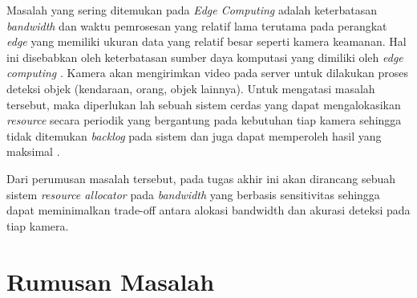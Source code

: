 Masalah yang sering ditemukan pada \textit{Edge Computing} adalah keterbatasan \textit{bandwidth} dan waktu pemrosesan yang relatif lama terutama pada perangkat \textit{edge} yang memiliki ukuran data yang relatif besar seperti
kamera keamanan. Hal ini disebabkan oleh keterbatasan sumber daya komputasi yang dimiliki oleh \textit{edge computing} \citep{edgeCompDis}. Kamera akan mengirimkan video pada server untuk dilakukan proses deteksi objek (kendaraan, orang, objek lainnya). 
Untuk mengatasi masalah tersebut, maka diperlukan lah sebuah sistem cerdas yang dapat mengalokasikan \textit{resource} secara periodik yang bergantung pada kebutuhan tiap kamera sehingga
tidak ditemukan \textit{backlog} pada sistem dan juga dapat memperoleh hasil yang maksimal \citep{edgeComp2}.

Dari perumusan masalah tersebut, pada tugas akhir ini akan dirancang sebuah sistem \textit{resource allocator} pada \textit{bandwidth} yang berbasis
sensitivitas sehingga dapat meminimalkan trade-off antara alokasi bandwidth dan akurasi deteksi pada tiap kamera. 


\section{Rumusan Masalah}




